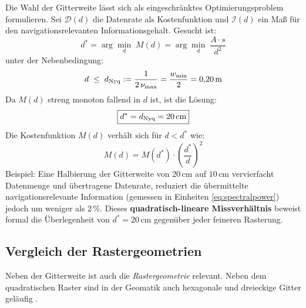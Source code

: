 ﻿\documentclass[a4paper,12pt]{article}
\theoremstyle{definition}
\begin{document}
Die Wahl der Gitterweite lässt sich als eingeschränktes
Optimierungsproblem formulieren. Sei $\mathcal{D}(d)$ die Datenrate
als Kostenfunktion und $\mathcal{I}(d)$ ein Maß für den
navigationsrelevanten Informationsgehalt. Gesucht ist:
\begin{equation}
  d^* = \arg\min_{d}\; M(d) = \arg\min_{d}\; \frac{A \cdot s}{d^2}
  \label{eq:opt_ziel}
\end{equation}
unter der Nebenbedingung:
\begin{equation}
  d \;\leq\; d_{\rm Nyq} := \frac{1}{2\,\nu_{\max}}
  = \frac{w_{\min}}{2} = 0{,}20\,\text{m}
  \label{eq:opt_neb}
\end{equation}
Da $M(d)$ streng monoton fallend in $d$ ist, ist die Lösung:
\begin{equation}
  \boxed{d^* = d_{\rm Nyq} = 20\,\text{cm}}
  \label{eq:opt_loesung}
\end{equation}
Die Kostenfunktion $M(d)$ verhält sich für $d < d^*$ wie:
\begin{equation}
  M(d) = M(d^*) \cdot \left(\frac{d^*}{d}\right)^2
  \label{eq:kostenquadrat}
\end{equation}
Beispiel: Eine Halbierung der Gitterweite von $20\,\text{cm}$ auf
$10\,\text{cm}$ vervierfacht Datenmenge und übertragene Datenrate,
reduziert die übermittelte navigationsrelevante Information
(gemessen in Einheiten \eqref{eq:spectralpower}) jedoch um weniger
als $2\,\%$. Dieses \textbf{quadratisch-lineare Missverhältnis}
beweist formal die Überlegenheit von $d^* = 20\,\text{cm}$
gegenüber jeder feineren Rasterung.

\subsection{Vergleich der Rastergeometrien}

Neben der Gitterweite ist auch die \emph{Rastergeometrie} relevant.
Neben dem quadratischen Raster sind in der Geomatik auch
hexagonale und dreieckige Gitter geläufig \cite{sahr2003}.
\end{document}
